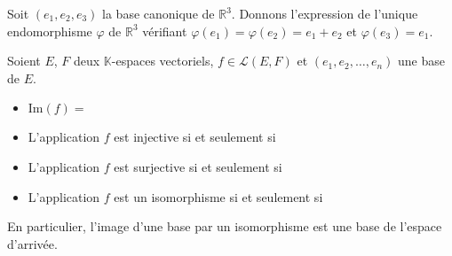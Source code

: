 \documentclass[a4paper,10pt]{report}
\begin{document}
\begin{ex} Soit $(e_1, e_2, e_3)$ la base canonique de $\mathbb{R}^3$. Donnons l'expression de l'unique endomorphisme $\varphi$ de $\mathbb{R}^3$ vérifiant $\varphi(e_1)= \varphi(e_2)= e_1+e_2$ et $\varphi(e_3)=e_1$.

\vspace{8cm}
\end{ex}

\begin{thm} Soient $E$, $F$ deux $\mathbb{K}$-espaces vectoriels, $f \in \mathcal{L}(E,F)$ et $(e_1, e_2, \ldots, e_n)$ une base de $E$.

\begin{itemize}
\item $\textrm{Im}(f) = \phantom{\textrm{Vect}(f(e_1), f(e_2), \ldots, f(e_n))}$
\item L'application $f$ est injective si et seulement si \phantom{$(f(e_1), f(e_2), \ldots, f(e_n))$ est une famille libre.}
\item L'application $f$ est surjective si et seulement si \phantom{$(f(e_1), f(e_2), \ldots, f(e_n))$ est une famille génératrice de $F$.}
\item L'application $f$ est un isomorphisme si et seulement si \phantom{$(f(e_1), f(e_2), \ldots, f(e_n))$ est une base.}
\end{itemize}
\end{thm}

\begin{rem} En particulier, l'image d'une base par un isomorphisme est une base de l'espace d'arrivée.
\end{rem}
\end{document}
